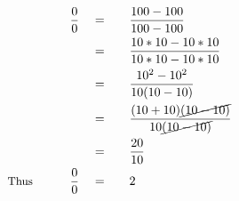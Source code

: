 \begin{alignat*}{5}
&\,&\frac{0}{0}\quad&=\quad&&\frac{100-100}{100-100}\\
&\,&\,&=&&\frac{10*10-10*10}{10*10-10*10}\\
&\,&\,&=&&\frac{10^2-10^2}{10(10-10)}\\
&\,&\,&=&&\frac{(10+10)\cancel{(10-10)}}{10\cancel{(10-10)}}\\
&\,&\,&=&&\frac{20}{10}\\
&\small\text{Thus}\normalsize\qquad&\frac{0}{0}\quad&=&&2
\end{alignat*}
